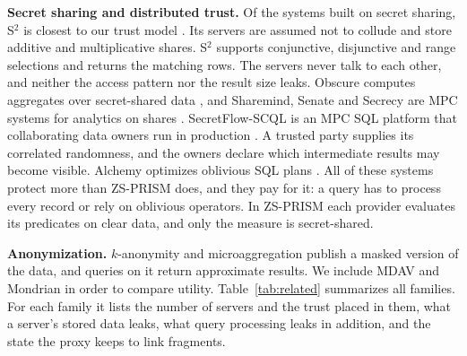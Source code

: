 \documentclass[conference]{IEEEtran}
\newcommand{\sys}{ZS-PRISM}
\begin{document}
\textbf{Secret sharing and distributed trust.}
Of the systems built on secret sharing, S$^2$ is closest to our trust model \cite{sharma2023s2}. Its servers are assumed not to collude and store additive and multiplicative shares. S$^2$ supports conjunctive, disjunctive and range selections and returns the matching rows. The servers never talk to each other, and neither the access pattern nor the result size leaks. Obscure computes aggregates over secret-shared data \cite{gupta2019obscure}, and Sharemind, Senate and Secrecy are MPC systems for analytics on shares \cite{bogdanov2008sharemind,poddar2021senate,liagouris2023secrecy}. SecretFlow-SCQL is an MPC SQL platform that collaborating data owners run in production \cite{fang2024scql}. A trusted party supplies its correlated randomness, and the owners declare which intermediate results may become visible. Alchemy optimizes oblivious SQL plans \cite{sohn2025alchemy}. All of these systems protect more than \sys{} does, and they pay for it: a query has to process every record or rely on oblivious operators. In \sys{} each provider evaluates its predicates on clear data, and only the measure is secret-shared.

\textbf{Anonymization.}
$k$-anonymity \cite{sweeney2002k} and microaggregation \cite{domingo2005ordinal} publish a masked version of the data, and queries on it return approximate results. We include MDAV and Mondrian \cite{lefevre2006mondrian} in order to compare utility. Table~\ref{tab:related} summarizes all families. For each family it lists the number of servers and the trust placed in them, what a server's stored data leaks, what query processing leaks in addition, and the state the proxy keeps to link fragments.
\end{document}
